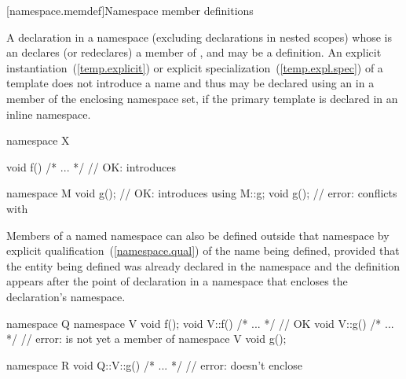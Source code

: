 [namespace.memdef]{Namespace member definitions}%

\pnum
A declaration in a namespace  (excluding declarations in nested scopes)
whose  is an 
declares (or redeclares) a member of , and may be a definition.
\enternote An explicit instantiation~(\ref{temp.explicit}) or
explicit specialization~(\ref{temp.expl.spec}) of a template
does not introduce a name and thus may be declared using an
 in a member of the enclosing namespace set,
if the primary template is declared in an inline namespace. \exitnote
\enterexample

\begin{codeblock}
namespace X {
  void f() { /* ... */ }  // OK: introduces 

  namespace M {
    void g();             // OK: introduces 
  }
  using M::g;
  void g();               // error: conflicts with 
}
\end{codeblock}
\exitexample

\pnum
Members of a named namespace can also be
defined outside that namespace by explicit
qualification~(\ref{namespace.qual}) of the name being defined, provided
that the entity being defined was already declared in the namespace and
the definition appears after the point of declaration in a namespace
that encloses the declaration's namespace.
\enterexample

\begin{codeblock}
namespace Q {
  namespace V {
    void f();
  }
  void V::f() { /* ... */ }     // OK
  void V::g() { /* ... */ }     // error:  is not yet a member of 
  namespace V {
    void g();
  }
}

namespace R {
  void Q::V::g() { /* ... */ }  // error:  doesn't enclose 
}
\end{codeblock}
\exitexample

